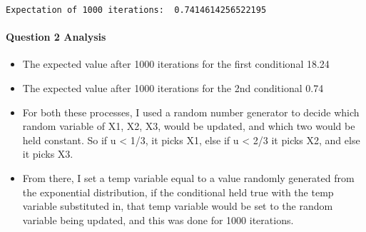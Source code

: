 \documentclass[11pt]{article}
\makeatletter
\providecommand{\tightlist}{%
      \setlength{\itemsep}{0pt}\setlength{\parskip}{0pt}}
\newcommand{\boxspacing}{\kern\kvtcb@left@rule\kern\kvtcb@boxsep}
\newcommand{\prompt}[4]{
        \ttfamily\llap{{\color{#2}[#3]:\hspace{3pt}#4}}\vspace{-\baselineskip}
    }
\makeatother
\begin{document}
    \begin{Verbatim}[commandchars=\\\{\}]
Expectation of 1000 iterations:  0.7414614256522195
    \end{Verbatim}

    \hypertarget{question-2-analysis}{%
\paragraph{Question 2 Analysis}\label{question-2-analysis}}

\begin{itemize}
\tightlist
\item
  The expected value after 1000 iterations for the first conditional
  18.24
\item
  The expected value after 1000 iterations for the 2nd conditional 0.74
\item
  For both these processes, I used a random number generator to decide
  which random variable of X1, X2, X3, would be updated, and which two
  would be held constant. So if u \textless{} 1/3, it picks X1, else if
  u \textless{} 2/3 it picks X2, and else it picks X3.\\
\item
  From there, I set a temp variable equal to a value randomly generated
  from the exponential distribution, if the conditional held true with
  the temp variable substituted in, that temp variable would be set to
  the random variable being updated, and this was done for 1000
  iterations.
\end{itemize}

    \begin{tcolorbox}[breakable, size=fbox, boxrule=1pt, pad at break*=1mm,colback=cellbackground, colframe=cellborder]
\prompt{In}{incolor}{ }{\boxspacing}
\begin{Verbatim}[commandchars=\\\{\}]

\end{Verbatim}
\end{tcolorbox}


    
    
    
\end{document}
